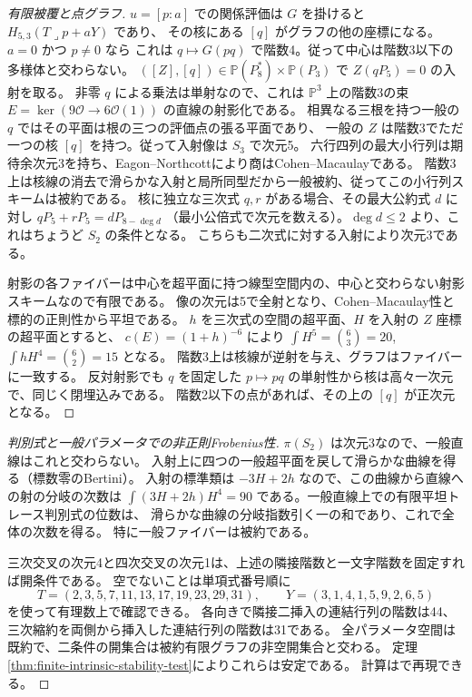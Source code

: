 \begin{proof}[有限被覆と点グラフ]
$u=[p:a]$ での関係評価は $G$ を掛けると $H_{5,3}(T\mathbin{\lrcorner}p+aY)$ であり、
その核にある $[q]$ がグラフの他の座標になる。$a=0$ かつ $p\ne0$ なら
これは $q\mapsto G(pq)$ で階数4。従って中心は階数3以下の多様体と交わらない。
$([Z],[q])\in\mathbb P(P_8^*)\times\mathbb P(P_3)$ で $Z(qP_5)=0$ の入射を取る。
非零 $q$ による乗法は単射なので、これは $\mathbb P^3$ 上の階数3の束
$E=\ker(9\mathcal O\to6\mathcal O(1))$ の直線の射影化である。
相異なる三根を持つ一般の $q$ ではその平面は根の三つの評価点の張る平面であり、
一般の $Z$ は階数3でただ一つの核 $[q]$ を持つ。従って入射像は $S_3$ で次元5。
六行四列の最大小行列は期待余次元3を持ち、Eagon--Northcottにより商はCohen--Macaulayである。
階数3上は核線の消去で滑らかな入射と局所同型だから一般被約、従ってこの小行列スキームは被約である。
核に独立な三次式 $q,r$ がある場合、その最大公約式 $d$ に対し $qP_5+rP_5=dP_{8-\deg d}$
（最小公倍式で次元を数える）。$\deg d\le2$ より、これはちょうど $S_2$ の条件となる。
こちらも二次式に対する入射により次元3である。

射影の各ファイバーは中心を超平面に持つ線型空間内の、中心と交わらない射影スキームなので有限である。
像の次元は5で全射となり、Cohen--Macaulay性と標的の正則性から平坦である。
$h$ を三次式の空間の超平面、$H$ を入射の $Z$ 座標の超平面とすると、
$c(E)=(1+h)^{-6}$ により $\int H^5=\binom63=20$, $\int hH^4=\binom62=15$ となる。
階数3上は核線が逆射を与え、グラフはファイバーに一致する。
反対射影でも $q$ を固定した $p\mapsto pq$ の単射性から核は高々一次元で、同じく閉埋込みである。
階数2以下の点があれば、その上の $[q]$ が正次元となる。
\end{proof}
\begin{proof}[判別式と一般パラメータでの非正則Frobenius性]
$\pi(S_2)$ は次元3なので、一般直線はこれと交わらない。
入射上に四つの一般超平面を戻して滑らかな曲線を得る（標数零のBertini）。
入射の標準類は $-3H+2h$ なので、この曲線から直線への射の分岐の次数は
$\int (3H+2h)H^4=90$ である。一般直線上での有限平坦トレース判別式の位数は、
滑らかな曲線の分岐指数引く一の和であり、これで全体の次数を得る。
特に一般ファイバーは被約である。

三次交叉の次元4と四次交叉の次元1は、上述の隣接階数と一文字階数を固定すれば開条件である。
空でないことは単項式番号順に
\[
 T=(2,3,5,7,11,13,17,19,23,29,31),\qquad Y=(3,1,4,1,5,9,2,6,5)
\]
を使って有理数上で確認できる。
各向きで隣接二挿入の連結行列の階数は44、三次縮約を両側から挿入した連結行列の階数は31である。
全パラメータ空間は既約で、二条件の開集合は被約有限グラフの非空開集合と交わる。
定理\ref{thm:finite-intrinsic-stability-test}によりこれらは安定である。
計算はで再現できる。
\end{proof}
